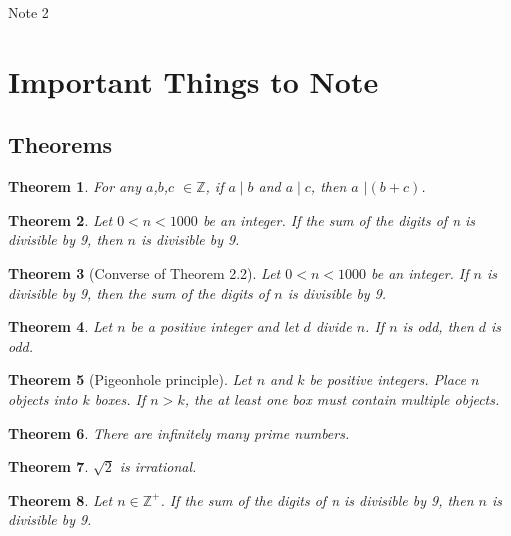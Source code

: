 \documentclass[12pt,a4paper]{article}
\newtheorem{theorem}{Theorem}[section]
\theoremstyle{definition}
\begin{document}
\raggedright

\begin{center}
	\huge{Note 2}
\end{center}

\section*{Important Things to Note}

\subsection*{Theorems}

\begin{theorem}
For any $a$,$b$,$c$ $\in\mathbb{Z}$, if $a \mid b$ and $a \mid c$, then $a$ $\mid(b+c)$.
\end{theorem}

\begin{theorem}
Let $0<n<1000$ be an integer. If the sum of the digits of n is divisible by 9, then $n$ is divisible by 9.
\end{theorem}

\begin{theorem}[Converse of Theorem 2.2]
Let $0<n<1000$ be an integer. If $n$ is divisible by 9, then the sum of the digits of $n$ is divisible by 9.
\end{theorem}

\begin{theorem}
Let $n$ be a positive integer and let $d$ divide $n$. If $n$ is odd, then $d$ is odd.
\end{theorem}

\begin{theorem}[Pigeonhole principle]
Let $n$ and $k$ be positive integers. Place $n$ objects into $k$ boxes. If $n>k$, the at least one box must contain multiple objects.
\end{theorem}

\begin{theorem}
There are infinitely many prime numbers.
\end{theorem}

\begin{theorem}
$\sqrt{2}$ is irrational.
\end{theorem}

\begin{theorem}
Let $n\in\mathbb{Z}^+$. If the sum of the digits of n is divisible by 9, then $n$ is divisible by 9.
\end{theorem}
\end{document}
